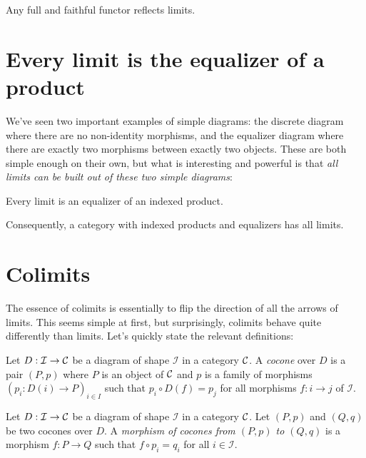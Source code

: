 \begin{proposition}
  Any full and faithful functor reflects limits.
\end{proposition}


\section{Every limit is the equalizer of a product}
We've seen two important examples of simple diagrams:
the discrete diagram where there are no non-identity morphisms,
and the equalizer diagram where there are exactly 
two morphisms between exactly two objects. 
These are both simple enough on their own, but what is 
interesting and powerful is that \emph{all limits can be 
built out of these two simple diagrams}:

\begin{theorem}
  Every limit is an equalizer of an indexed product.
\end{theorem}

Consequently, a category with indexed products and equalizers has all limits.

\section{Colimits}
The essence of colimits is essentially to flip the direction of all the arrows
of limits. This seems simple at first, but surprisingly, colimits 
behave quite differently than limits. Let's quickly state the relevant 
definitions:

\begin{definition}[Cocone]
  \sloppy
  Let \(D : \mathcal I \to \mathcal C\) be a diagram of shape \(\mathcal I\)
  in a category \(\mathcal C\).
  A \emph{cocone} over \(D\) is a pair \((P,p)\)
  where \(P\) is an object of \(\mathcal C\)
  and \(p\) is a family of morphisms \((p_i : D(i) \to P)_{i\in I}\)
  such that \(p_i \circ D(f) = p_j\) for all morphisms \(f : i \to j\)
  of \(\mathcal I\).
\end{definition}

\begin{definition}
  Let \(D : \mathcal I \to \mathcal C\) be a diagram of shape \(\mathcal I\)
  in a category \(\mathcal C\).
  Let \((P,p)\) and \((Q,q)\) be two cocones over \(D\).
  A \emph{morphism of cocones from \((P,p)\) to \((Q,q)\)}
  is a morphism \(f : P \to Q\) such that \(f \circ p_i = q_i\)
  for all \(i \in \mathcal I\).
\end{definition}

